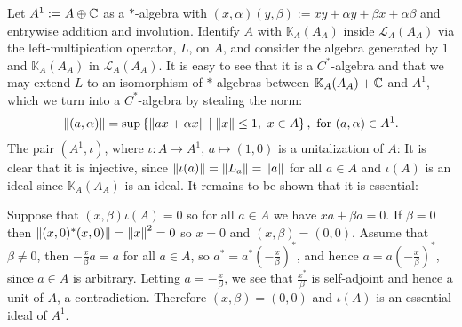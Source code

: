 \begin{example}
	Let $A^1 := A \oplus \mathbb{C}$ as a $*$-algebra with $(x,\alpha)(y,\beta):=xy+\alpha y + \beta x + \alpha \beta$ and entrywise addition and involution. Identify $A$ with $\mathbb{K}_A(A_A)$ inside $\mathcal{L}_A(A_A)$ via the left-multipication operator, $L$, on $A$, and consider the algebra generated by $1$ and $\mathbb{K}_A(A_A)$ in $\mathcal{L}_A(A_A)$. It is easy to see that it is a $C^*$-algebra and that we may extend $L$ to an isomorphism of $*$-algebras between $\mathbb{K}_A(A_A)+\mathbb{C}$ and $A^1$, which we turn into a $C^*$-algebra by stealing the norm:
	\begin{align*}
		\left\lVert (a,\alpha)\right\rVert = \sup\left\{ \left\lVert ax + \alpha x \right\rVert \mid \left\lVert x \right\rVert \leq 1, \ x \in A \right\}, \text{ for } (a,\alpha) \in A^1.
	\end{align*}
	The pair $(A^1,\iota)$, where $\iota \colon A \to A^1$, $a \mapsto (1,0)$ is a unitalization of $A$: It is clear that it is injective, since $\left\lVert \iota(a)\right\rVert = \left\lVert L_a \right\rVert = \left\lVert a \right\rVert$ for all $a \in A$ and $\iota(A)$ is an ideal since $\mathbb{K}_{A}(A_A)$ is an ideal. It remains to be shown that it is essential:

	Suppose that $(x,\beta) \iota(A)=0$ so for all $a \in A$ we have $xa+\beta a = 0$. If $\beta = 0$ then $\left\lVert(x,0)^*(x,0)\right\rVert = \left\lVert x\right\rVert^2 = 0$ so $x = 0$ and $(x,\beta)=(0,0)$. Assume that $\beta \neq 0$, then $-\frac{x}{\beta}a = a$ for all $ a \in A$, so $a^* = a^* \left( - \frac{x}{\beta}\right)^*$, and hence $a = a\left(-\frac{x}{\beta}\right)^*$, since $a \in A$ is arbitrary. Letting $a = -\frac{x}{\beta}$, we see that $\frac{x^*}{\beta}$ is self-adjoint and hence a unit of $A$, a contradiction. Therefore $(x,\beta) = (0,0)$ and $\iota(A)$ is an essential ideal of $A^1$.
\end{example}

